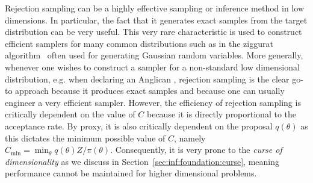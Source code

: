 Rejection sampling can be a highly effective sampling or inference method in low dimensions.
In particular, the fact that it generates exact samples from the target distribution can be very
useful.  This very rare characteristic is used to construct efficient samplers for many 
common distributions such as in the ziggurat algorithm~\citep{marsaglia2000ziggurat} often
used for generating Gaussian random variables.  More generally, whenever one wishes to construct
a sampler for a non-standard low dimensional distribution, e.g. when declaring an Anglican ,
rejection sampling is the clear go-to approach because it produces exact samples and because
one can usually engineer a very efficient sampler.
However, the efficiency of rejection sampling is critically dependent
on the value of $C$ because it is directly proportional to the acceptance rate.  By proxy, it
is also critically dependent on the proposal $q(\theta)$ as this dictates the minimum possible
value of $C$, namely $C_{\min} = \min_{\theta} q(\theta) Z / \pi(\theta)$.  
 Consequently, it is very prone to the \emph{curse of dimensionality} as
we discuss in Section~\ref{sec:inf:foundation:curse}, meaning performance cannot be
maintained for higher dimensional problems.